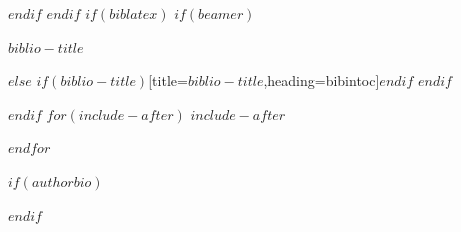 \documentclass[
$if(fontsize)$
  $fontsize$,
$endif$
$if(lang)$
  $babel-lang$,
$endif$
$if(papersize)$
  $papersize$paper,
$endif$
$if(beamer)$
  ignorenonframetext,
$if(handout)$
  handout,
$endif$
$if(aspectratio)$
  aspectratio=$aspectratio$,
$endif$
$endif$
$for(classoption)$
  $classoption$$sep$,
$endfor$
]{$documentclass$}
\newif\ifbibliography
\begin{document}
$endif$
$endif$
$if(biblatex)$
$if(beamer)$
\begin{frame}[allowframebreaks]{$biblio-title$}
  \bibliographytrue
  \printbibliography[heading=none]
\end{frame}
$else$
\begingroup
\printbibliography$if(biblio-title)$[title=$biblio-title$,heading=bibintoc]$endif$
\endgroup
$endif$

$endif$
$for(include-after)$
$include-after$

$endfor$

\printindex

\clearpage{\thispagestyle{empty}\cleardoublepage}

$if(authorbio)$
\pagestyle{empty}

$endif$
\end{document}
